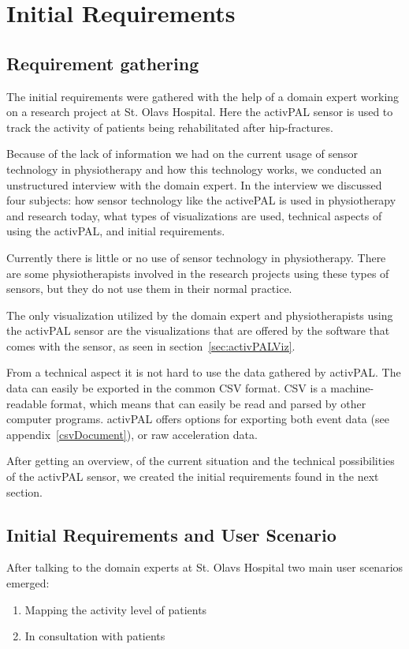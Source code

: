 \chapter{Initial Requirements}
\label{ch:initialRequirements}

\section{Requirement gathering}
The initial requirements were gathered with the help of a domain expert working on a research project at St. Olavs Hospital. Here the activPAL sensor is used to track the activity of patients being rehabilitated after hip-fractures.

Because of the lack of information we had on the current usage of sensor technology in physiotherapy and how this technology works, we conducted an unstructured interview with the domain expert. In the interview we discussed four subjects: how sensor technology like the activePAL is used in physiotherapy and research today, what types of visualizations are used, technical aspects of using the activPAL, and initial requirements. 

Currently there is little or no use of sensor technology in physiotherapy. There are some physiotherapists involved in the research projects using these types of sensors, but they do not use them in their normal practice. 

The only visualization utilized by the domain expert and physiotherapists using the activPAL sensor are the visualizations that are offered by the software that comes with the sensor, as seen in section~\ref{sec:activPALViz}.

From a technical aspect it is not hard to use the data gathered by activPAL. The data can easily be exported in the common CSV format. CSV is a machine-readable format, which means that can easily be read and parsed by other computer programs. activPAL offers options for exporting both event data (see appendix~\ref{csvDocument}), or raw acceleration data.

After getting an overview, of the current situation and the technical possibilities of the activPAL sensor, we created the initial requirements found in the next section.

\section{Initial Requirements and User Scenario}
After talking to the domain experts at St. Olavs Hospital two main user scenarios emerged:
\vspace{-3mm}
\begin{enumerate}[itemsep=0cm, parsep=0cm]
  \item Mapping the activity level of patients
  \item In consultation with patients
\end{enumerate}

